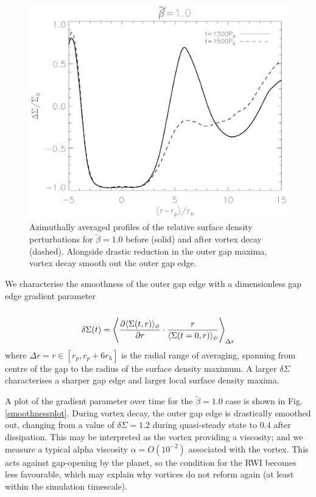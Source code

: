 \begin{figure}
  \includegraphics[width=\linewidth]{figures/gapchange}
  \caption{Azimuthally averaged profiles of the relative surface
    density perturbations for  $\tilde\beta=1.0$
    before (solid) and after vortex decay
    (dashed). Alongside drastic reduction in the outer gap maxima, vortex decay
    smooth out the outer gap edge.
    \label{gap_smoothed}} 
\end{figure}

We characterise the smoothness of the outer gap edge with a dimensionless
gap edge gradient parameter
\begin{align}
  \delta\Sigma(t)= \la \frac{\partial \langle \Sigma(t,r)
    \rangle_{\phi}}{\partial r} \cdot \frac{r}{\langle \Sigma(t=0,r)
    \rangle_{\phi}} \ra_{\Delta r}  
\end{align}
where $\Delta r = r\in [r_p,r_p + 6r_h]$ is the radial range of averaging, spanning
from centre of the gap to the radius of the surface density maximum.
A larger $\delta \Sigma$ characterises a sharper gap edge and  
larger local surface density maxima.   

A plot of the gradient parameter over time
for the $\tilde\beta=1.0$ case is shown in Fig. \ref{smoothnessplot}.
During vortex decay, the outer gap edge is 
drastically smoothed out, changing from a value of $\delta\Sigma=1.2$ during
quasi-steady state to $0.4$ after dissipation. 
This may be interpreted as the vortex providing a viscosity;  
and we measure a typical alpha viscosity $\alpha = O(10^{-2})$
associated with the vortex. This acts against gap-opening
by the planet, so the condition for the RWI
becomes less favourable, which may explain why vortices do not
reform again (at least within the simulation timescale). 

